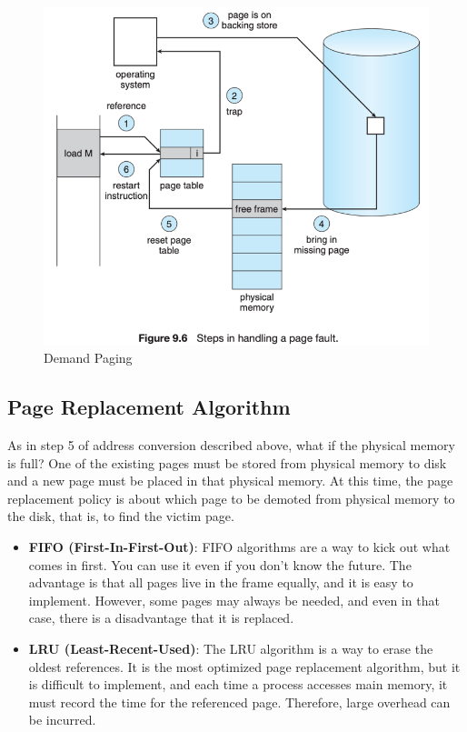 \documentclass{homework}
\begin{document}
\begin{figure}[h]
\begin{center}
\includegraphics[scale=0.7]{34.png}    
\caption{Demand Paging}
\end{center}
\end{figure}
\pagebreak

\subsection{Page Replacement Algorithm}
As in step 5 of address conversion described above, what if the physical memory is full? One of the existing pages must be stored from physical memory to disk and a new page must be placed in that physical memory. At this time, the page replacement policy is about which page to be demoted from physical memory to the disk, that is, to find the victim page.
\begin{itemize}
    \item \textbf{FIFO (First-In-First-Out)}: FIFO algorithms are a way to kick out what comes in first. You can use it even if you don't know the future. The advantage is that all pages live in the frame equally, and it is easy to implement. However, some pages may always be needed, and even in that case, there is a disadvantage that it is replaced.
    \item \textbf{LRU (Least-Recent-Used)}: The LRU algorithm is a way to erase the oldest references. It is the most optimized page replacement algorithm, but it is difficult to implement, and each time a process accesses main memory, it must record the time for the referenced page. Therefore, large overhead can be incurred.
\end{itemize}
\end{document}
